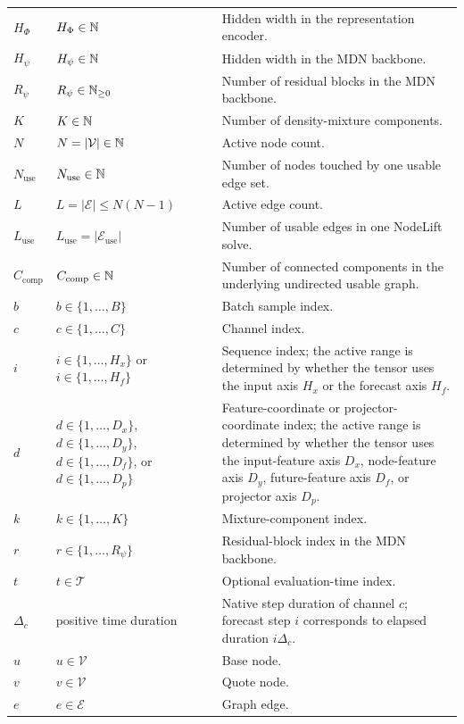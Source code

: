 \begin{center}
\begin{longtable}{>{\raggedright\arraybackslash}p{}
                  >{\raggedright\arraybackslash}p{}
                  >{\raggedright\arraybackslash}p{}}
$H_{\Phi}$ & $H_{\Phi} \in \mathbb{N}$ & Hidden width in the representation encoder. \\
$H_{\psi}$ & $H_{\psi} \in \mathbb{N}$ & Hidden width in the MDN backbone. \\
$R_{\psi}$ & $R_{\psi} \in \mathbb{N}_{\ge 0}$ & Number of residual blocks in the MDN backbone. \\
$K$ & $K \in \mathbb{N}$ & Number of density-mixture components. \\
$N$ & $N = |\mathcal{V}| \in \mathbb{N}$ & Active node count. \\
$N_{\mathrm{use}}$ & $N_{\mathrm{use}}\in\mathbb{N}$ & Number of nodes touched by one usable edge set. \\
$L$ & $L=|\mathcal{E}|\le N(N-1)$ & Active edge count. \\
$L_{\mathrm{use}}$ & $L_{\mathrm{use}}=|\mathcal{E}_{\mathrm{use}}|$ & Number of usable edges in one NodeLift solve. \\
$C_{\mathrm{comp}}$ & $C_{\mathrm{comp}}\in\mathbb{N}$ & Number of connected components in the underlying undirected usable graph. \\
\midrule
$b$ & $b \in \{1,\ldots,B\}$ & Batch sample index. \\
$c$ & $c \in \{1,\ldots,C\}$ & Channel index. \\
$i$ & $i \in \{1,\ldots,H_x\}$ or $i \in \{1,\ldots,H_f\}$ & Sequence index; the active range is determined by whether the tensor uses the input axis $H_x$ or the forecast axis $H_f$. \\
$d$ & $d \in \{1,\ldots,D_x\}$, $d \in \{1,\ldots,D_y\}$, $d \in \{1,\ldots,D_f\}$, or $d \in \{1,\ldots,D_p\}$ & Feature-coordinate or projector-coordinate index; the active range is determined by whether the tensor uses the input-feature axis $D_x$, node-feature axis $D_y$, future-feature axis $D_f$, or projector axis $D_p$. \\
$k$ & $k \in \{1,\ldots,K\}$ & Mixture-component index. \\
$r$ & $r \in \{1,\ldots,R_{\psi}\}$ & Residual-block index in the MDN backbone. \\
$t$ & $t \in \mathcal{T}$ & Optional evaluation-time index. \\
$\Delta_c$ & positive time duration & Native step duration of channel $c$; forecast step $i$ corresponds to elapsed duration $i\Delta_c$. \\
$u$ & $u \in \mathcal{V}$ & Base node. \\
$v$ & $v \in \mathcal{V}$ & Quote node. \\
$e$ & $e \in \mathcal{E}$ & Graph edge. \\

\end{longtable}
\end{center}

